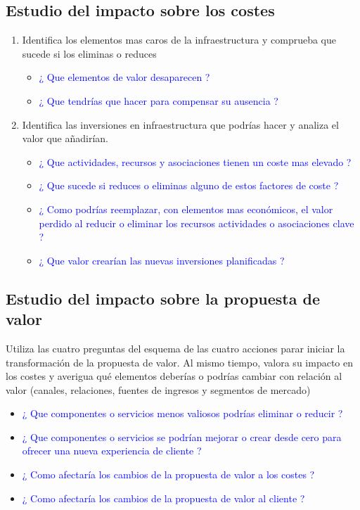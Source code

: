 \documentclass[11pt]{book}
\begin{document}
\subsection{Estudio del impacto sobre los costes}
\begin{enumerate}
\item Identifica los elementos mas caros de la infraestructura y comprueba que sucede si los eliminas o reduces
\begin{itemize}
\item\textcolor{blue}{¿ Que elementos de valor desaparecen ?}
\item\textcolor{blue}{¿ Que tendrías que hacer para compensar su ausencia ?}
\end{itemize}
\item Identifica las inversiones en infraestructura que podrías hacer y analiza el valor que añadirían.
\begin{itemize}
\item\textcolor{blue}{¿ Que actividades, recursos y asociaciones tienen un coste mas elevado ?}
\item\textcolor{blue}{¿ Que sucede si reduces o eliminas alguno de estos factores de coste ?}
\item\textcolor{blue}{¿ Como podrías reemplazar, con elementos mas económicos, el valor perdido al reducir o eliminar los recursos actividades o asociaciones clave ?}
\item\textcolor{blue}{¿ Que valor crearían las nuevas inversiones planificadas ?}
\end{itemize} 
\end{enumerate}
\subsection{Estudio del impacto sobre la propuesta de valor}
Utiliza las cuatro preguntas del esquema de las cuatro
acciones parar iniciar la transformación de la propuesta de
valor.
Al mismo tiempo, valora su impacto en los costes y
averigua qué elementos deberías o podrías cambiar con
relación al valor (canales, relaciones, fuentes de ingresos y
segmentos de mercado)
\begin{itemize}
\item\textcolor{blue}{¿ Que componentes o servicios menos valiosos podrías eliminar o reducir ?}
\item\textcolor{blue}{¿ Que componentes o servicios se podrían mejorar o crear desde cero para ofrecer una nueva experiencia de cliente ?}
\item\textcolor{blue}{¿ Como afectaría los cambios de la propuesta de valor a los costes ?}
\item\textcolor{blue}{¿ Como afectaría los cambios de la propuesta de valor al cliente ?}
\end{itemize}
\end{document}
